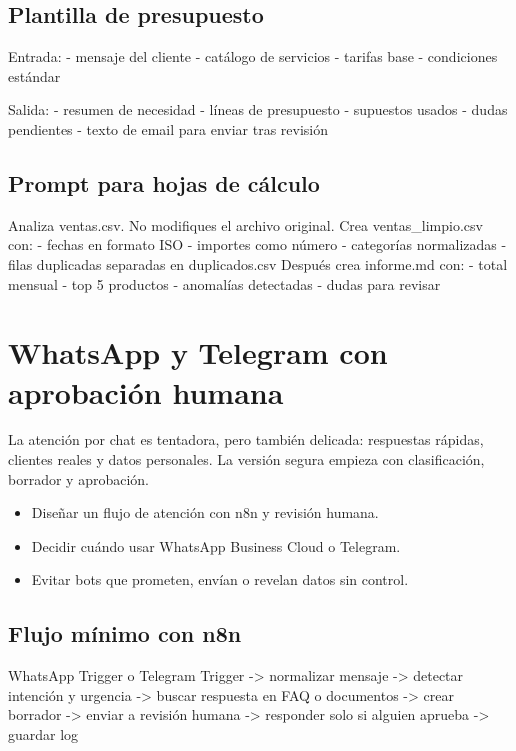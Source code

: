 \documentclass[11pt,a4paper]{book}
\begin{document}
\section{Plantilla de presupuesto}
\begin{codebox}
Entrada:
- mensaje del cliente
- catálogo de servicios
- tarifas base
- condiciones estándar

Salida:
- resumen de necesidad
- líneas de presupuesto
- supuestos usados
- dudas pendientes
- texto de email para enviar tras revisión
\end{codebox}
\section{Prompt para hojas de cálculo}
\begin{codebox}
Analiza ventas.csv.
No modifiques el archivo original.
Crea ventas_limpio.csv con:
- fechas en formato ISO
- importes como número
- categorías normalizadas
- filas duplicadas separadas en duplicados.csv
Después crea informe.md con:
- total mensual
- top 5 productos
- anomalías detectadas
- dudas para revisar
\end{codebox}
\chapter{WhatsApp y Telegram con aprobación humana}
La atención por chat es tentadora, pero también delicada: respuestas rápidas, clientes reales y datos personales. La versión segura empieza con clasificación, borrador y aprobación.

\begin{itemize}\item Diseñar un flujo de atención con n8n y revisión humana.\end{itemize}
\begin{itemize}\item Decidir cuándo usar WhatsApp Business Cloud o Telegram.\end{itemize}
\begin{itemize}\item Evitar bots que prometen, envían o revelan datos sin control.\end{itemize}
\section{Flujo mínimo con n8n}
\begin{codebox}
WhatsApp Trigger o Telegram Trigger
  -> normalizar mensaje
  -> detectar intención y urgencia
  -> buscar respuesta en FAQ o documentos
  -> crear borrador
  -> enviar a revisión humana
  -> responder solo si alguien aprueba
  -> guardar log
\end{codebox}
\end{document}
